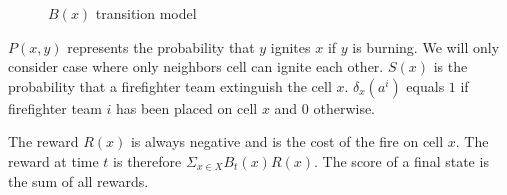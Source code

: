 \begin{figure}[htpb]
    \caption{\(B(x)\) transition model}%
    \label{fig:B_state_machine}
\end{figure}

\(P(x, y)\) represents the probability that \(y\) ignites \(x\) if \(y\) is burning.
We will only consider case where only neighbors cell can ignite each other.
\(S(x)\) is the probability that a firefighter team extinguish the cell \(x\).
\(\delta_{x}(a^{i})\) equals \(1\) if firefighter team \(i\) has been placed on cell \(x\) and \(0\) otherwise.

The reward \(R(x)\) is always negative and is the cost of the fire on cell \(x\).
The reward at time \(t\) is therefore \(\Sigma_{x \in X} B_{t}(x)R(x)\).
The score of a final state is the sum of all rewards.
